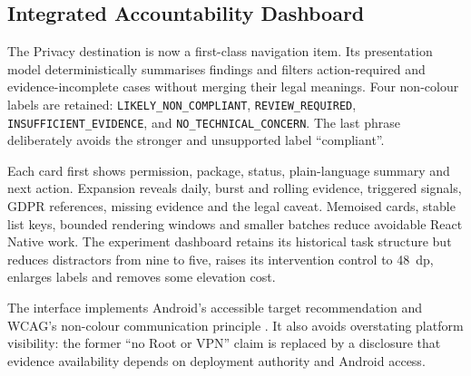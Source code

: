 
\subsection{Integrated Accountability Dashboard}

The Privacy destination is now a first-class navigation item. Its presentation model deterministically summarises findings and filters action-required and evidence-incomplete cases without merging their legal meanings. Four non-colour labels are retained: \texttt{LIKELY\_NON\_COMPLIANT}, \texttt{REVIEW\_REQUIRED}, \texttt{INSUFFICIENT\_EVIDENCE}, and \texttt{NO\_TECHNICAL\_CONCERN}. The last phrase deliberately avoids the stronger and unsupported label ``compliant''.

Each card first shows permission, package, status, plain-language summary and next action. Expansion reveals daily, burst and rolling evidence, triggered signals, GDPR references, missing evidence and the legal caveat. Memoised cards, stable list keys, bounded rendering windows and smaller batches reduce avoidable React Native work. The experiment dashboard retains its historical task structure but reduces distractors from nine to five, raises its intervention control to 48~dp, enlarges labels and removes some elevation cost.

The interface implements Android's accessible target recommendation and WCAG's non-colour communication principle \cite{androidaccess,wcag22}. It also avoids overstating platform visibility: the former ``no Root or VPN'' claim is replaced by a disclosure that evidence availability depends on deployment authority and Android access.

